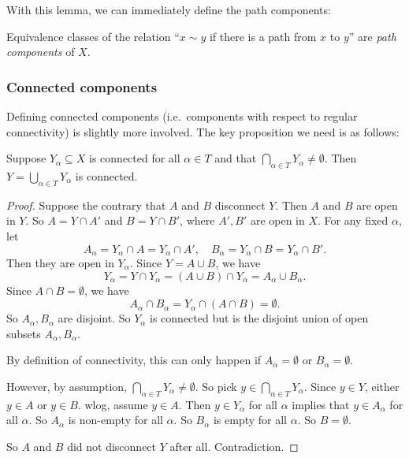 \documentclass[a4paper]{article}
\begin{document}
With this lemma, we can immediately define the path components:
\begin{defi}
  Equivalence classes of the relation ``$x\sim y$ if there is a path from $x$ to $y$'' are \emph{path components} of $X$.
\end{defi}

\subsubsection{Connected components}
Defining connected components (i.e.\ components with respect to regular connectivity) is slightly more involved. The key proposition we need is as follows:

\begin{prop}
  Suppose $Y_\alpha\subseteq X$ is connected for all $\alpha\in T$ and that $\bigcap_{\alpha\in T}Y_\alpha \not= \emptyset$. Then $Y = \bigcup_{\alpha\in T}Y_\alpha$ is connected.
\end{prop}

\begin{proof}
  Suppose the contrary that $A$ and $B$ disconnect $Y$. Then $A$ and $B$ are open in $Y$. So $A = Y\cap A'$ and $B = Y\cap B'$, where $A', B'$ are open in $X$. For any fixed $\alpha$, let
  \[
    A_\alpha = Y_\alpha \cap A = Y_\alpha \cap A',\quad B_\alpha = Y_\alpha\cap B = Y_\alpha \cap B'.
  \]
  Then they are open in $Y_\alpha$. Since $Y = A\cup B$, we have
  \[
    Y_\alpha = Y\cap Y_\alpha = (A\cup B)\cap Y_\alpha = A_\alpha \cup B_\alpha.
  \]
  Since $A\cap B = \emptyset$, we have
  \[
    A_\alpha \cap B_\alpha = Y_\alpha \cap (A\cap B) = \emptyset.
  \]
  So $A_\alpha, B_\alpha$ are disjoint. So $Y_\alpha$ is connected but is the disjoint union of open subsets $A_\alpha, B_\alpha$.

  By definition of connectivity, this can only happen if $A_\alpha = \emptyset$ or $B_\alpha = \emptyset$.

  However, by assumption, $\displaystyle\bigcap_{\alpha \in T}Y_\alpha \not= \emptyset$. So pick $\displaystyle y\in \bigcap_{\alpha\in T}Y_\alpha$. Since $y\in Y$, either $y\in A$ or $y\in B$. wlog, assume $y\in A$. Then $y\in Y_\alpha$ for all $\alpha$ implies that $y\in A_\alpha$ for all $\alpha$. So $A_\alpha$ is non-empty for all $\alpha$. So $B_\alpha$ is empty for all $\alpha$. So $B = \emptyset$.

  So $A$ and $B$ did not disconnect $Y$ after all. Contradiction.
\end{proof}
\end{document}

